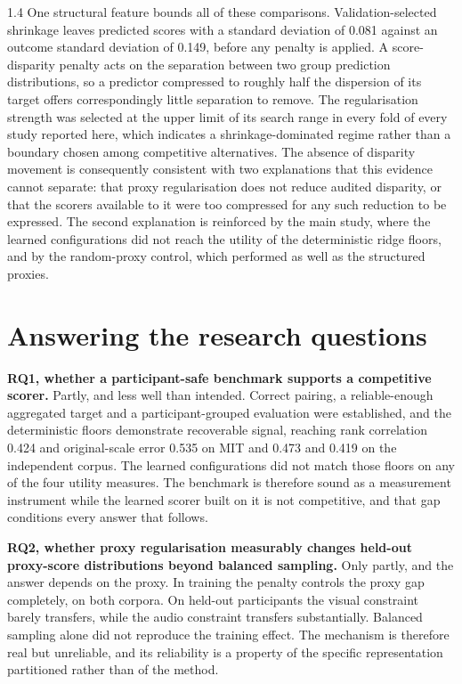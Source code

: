 \begin{spacing}{1.4}
One structural feature bounds all of these comparisons. Validation-selected shrinkage leaves
predicted scores with a standard deviation of 0.081 against an outcome standard deviation
of 0.149, before any penalty is applied. A score-disparity penalty acts on the separation
between two group prediction distributions, so a predictor compressed to roughly half the
dispersion of its target offers correspondingly little separation to remove. The regularisation
strength was selected at the upper limit of its search range in every fold of every study
reported here, which indicates a shrinkage-dominated regime rather than a boundary chosen
among competitive alternatives. The absence of disparity movement is consequently
consistent with two explanations that this evidence cannot separate: that proxy
regularisation does not reduce audited disparity, or that the scorers available to it
were too compressed for any such reduction to be expressed. The second explanation is
reinforced by the main study, where the learned configurations did not reach the utility of
the deterministic ridge floors, and by the random-proxy control, which performed as well as
the structured proxies.

\section{Answering the research questions}

\textbf{RQ1, whether a participant-safe benchmark supports a competitive scorer.} Partly,
and less well than intended. Correct pairing, a reliable-enough aggregated target and a
participant-grouped evaluation were established, and the deterministic floors demonstrate
recoverable signal, reaching rank correlation 0.424 and original-scale error 0.535 on MIT
and 0.473 and 0.419 on the independent corpus. The learned configurations did not match
those floors on any of the four utility measures. The benchmark is therefore sound as a
measurement instrument while the learned scorer built on it is not competitive, and that
gap conditions every answer that follows.

\textbf{RQ2, whether proxy regularisation measurably changes held-out proxy-score
distributions beyond balanced sampling.} Only partly, and the answer depends on the proxy.
In training the penalty controls the proxy gap completely, on both corpora. On held-out
participants the visual constraint barely transfers, while the audio constraint transfers
substantially. Balanced sampling alone did not reproduce the training effect. The mechanism
is therefore real but unreliable, and its reliability is a property of the specific
representation partitioned rather than of the method.


\end{spacing}
